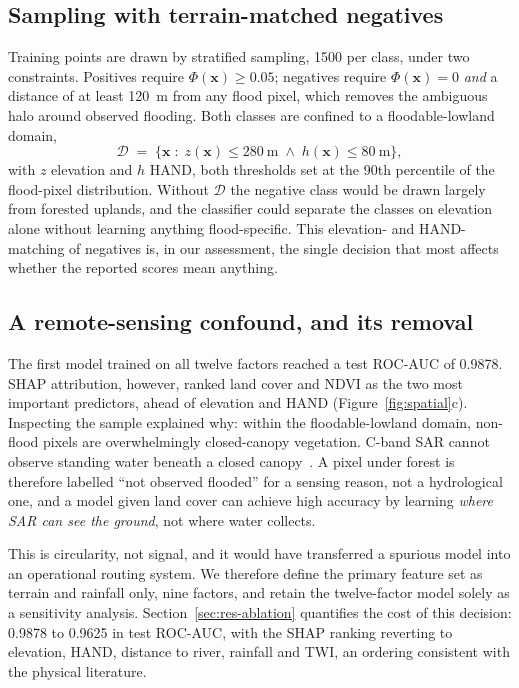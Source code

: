 \documentclass[11pt,a4paper]{article}
\begin{document}
\subsection{Sampling with terrain-matched negatives}
Training points are drawn by stratified sampling, \num{1500} per class, under two
constraints. Positives require $\Phi(\mathbf{x})\ge 0.05$; negatives require
$\Phi(\mathbf{x})=0$ \emph{and} a distance of at least \SI{120}{\metre} from any
flood pixel, which removes the ambiguous halo around observed flooding. Both
classes are confined to a floodable-lowland domain,
\begin{equation}
\mathcal{D} \;=\; \bigl\{\mathbf{x} \;:\; z(\mathbf{x}) \le \SI{280}{\metre}
\;\wedge\; h(\mathbf{x}) \le \SI{80}{\metre}\bigr\},
\label{eq:domain}
\end{equation}
with $z$ elevation and $h$ HAND, both thresholds set at the 90th percentile of
the flood-pixel distribution. Without $\mathcal{D}$ the negative class would be
drawn largely from forested uplands, and the classifier could separate the
classes on elevation alone without learning anything flood-specific. This
elevation- and HAND-matching of negatives is, in our assessment, the single
decision that most affects whether the reported scores mean anything.

\subsection{A remote-sensing confound, and its removal}
\label{sec:method-confound}
The first model trained on all twelve factors reached a test ROC-AUC of 0.9878.
SHAP attribution, however, ranked land cover and NDVI as the two most important
predictors, ahead of elevation and HAND (Figure~\ref{fig:spatial}c). Inspecting
the sample explained why: within the floodable-lowland domain, non-flood pixels
are overwhelmingly closed-canopy vegetation. C-band SAR cannot observe standing
water beneath a closed canopy~\citep{townsend2002,tsyganskaya2018}. A pixel under
forest is therefore labelled ``not observed flooded'' for a sensing reason, not a
hydrological one, and a model given land cover can achieve high accuracy by
learning \emph{where SAR can see the ground}, not where water collects.

This is circularity, not signal, and it would have transferred a spurious model
into an operational routing system. We therefore define the primary feature set
as terrain and rainfall only, nine factors, and retain the twelve-factor model
solely as a sensitivity analysis. Section~\ref{sec:res-ablation} quantifies the
cost of this decision: 0.9878 to 0.9625 in test ROC-AUC, with the SHAP ranking
reverting to elevation, HAND, distance to river, rainfall and TWI, an ordering
consistent with the physical literature.
\end{document}
